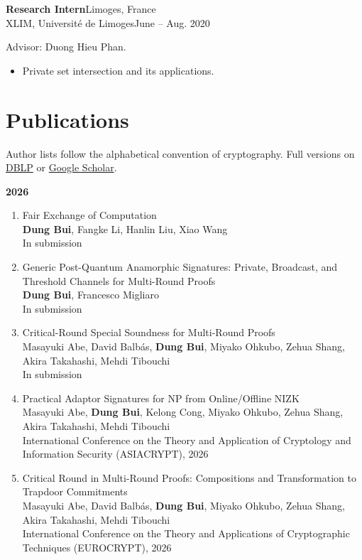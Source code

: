 \documentclass[11pt]{article}
\newcommand{\entry}[4]{%
  \needspace{3\baselineskip}%
  \noindent\textbf{#1}\hspace{1em}\hfill #2\\[0.15em]
  \noindent #3\hspace{1em}\hfill #4\par\vspace{0.45em}}
\begin{document}
\entry{Research Intern}{Limoges, France}
{XLIM, Universit\'e de Limoges}{June -- Aug. 2020}
\vspace{-0.45em}
\noindent Advisor: Duong Hieu Phan.\par\vspace{0.45em}
\vspace{-0.6em}
\begin{itemize}
      \item Private set intersection and its applications.
\end{itemize}

\section{Publications}

Author lists follow the alphabetical convention of cryptography. Full versions on
\href{https://dblp.uni-trier.de/pid/127/1711.html}{DBLP} or
\href{https://scholar.google.com/citations?user=StGOHMUAAAAJ}{Google Scholar}.

\smallskip
\textbf{2026}
\begin{enumerate}
      \item Fair Exchange of Computation\\
            \textbf{Dung Bui}, Fangke Li, Hanlin Liu, Xiao Wang\\
            In submission
      \item Generic Post-Quantum Anamorphic Signatures: Private, Broadcast, and Threshold Channels for Multi-Round Proofs\\
            \textbf{Dung Bui}, Francesco Migliaro\\
            In submission
      \item Critical-Round Special Soundness for Multi-Round Proofs\\
            Masayuki Abe, David Balb\'as, \textbf{Dung Bui}, Miyako Ohkubo, Zehua Shang, Akira Takahashi, Mehdi Tibouchi\\
            In submission
      \item Practical Adaptor Signatures for NP from Online/Offline NIZK\\
            Masayuki Abe, \textbf{Dung Bui}, Kelong Cong, Miyako Ohkubo, Zehua Shang, Akira Takahashi, Mehdi Tibouchi\\
            International Conference on the Theory and Application of Cryptology and Information Security (ASIACRYPT), 2026
      \item Critical Round in Multi-Round Proofs: Compositions and Transformation to Trapdoor Commitments\\
            Masayuki Abe, David Balb\'as, \textbf{Dung Bui}, Miyako Ohkubo, Zehua Shang, Akira Takahashi, Mehdi Tibouchi\\
            International Conference on the Theory and Applications of Cryptographic Techniques (EUROCRYPT), 2026
\end{enumerate}
\end{document}
